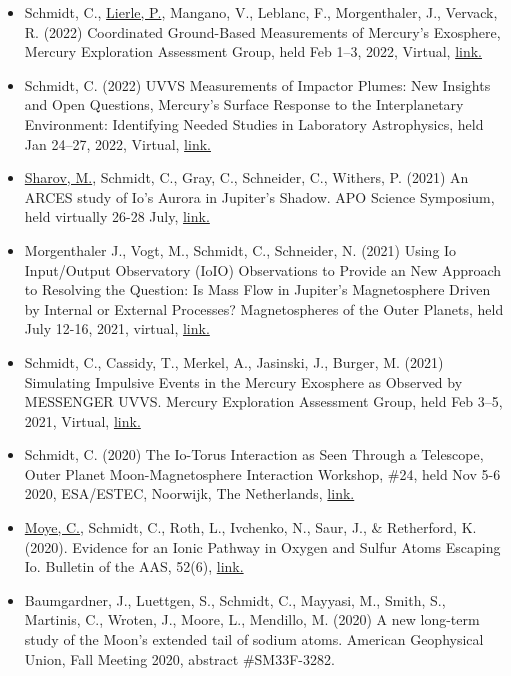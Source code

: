 \documentclass[12pt]{report}
\begin{document}
\begin{itemize}
   \item Schmidt, C., \underline{Lierle, P.}, Mangano, V., Leblanc, F., Morgenthaler, J., Vervack, R. (2022) Coordinated Ground-Based Measurements of Mercury’s Exosphere, Mercury Exploration Assessment Group, held Feb 1–3, 2022, Virtual, \href{https://www.hou.usra.edu/meetings/mexagfebruary2022/eposter/9007.pdf}{link.} 
   \item Schmidt, C. (2022) UVVS Measurements of Impactor Plumes: New Insights and Open Questions, Mercury’s Surface Response to the Interplanetary Environment: Identifying Needed Studies in Laboratory Astrophysics, held Jan 24–27, 2022, Virtual, \href{https://meeting.psi.edu/mercurylab2022/}{link.} 
   \item \underline{Sharov, M.}, Schmidt, C., Gray, C., Schneider, C., Withers, P. (2021) An ARCES study of Io's Aurora in Jupiter’s Shadow. APO Science Symposium, held virtually 26-28 July, \href{ http://astronomy.nmsu.edu/aposcisymposium21/}{link.} 
   \item Morgenthaler J., Vogt, M., Schmidt, C., Schneider, N. (2021) Using Io Input/Output Observatory (IoIO) Observations to Provide an New Approach to Resolving the Question: Is Mass Flow in Jupiter's Magnetosphere Driven by Internal or External Processes? Magnetospheres of the Outer Planets, held July 12-16, 2021, virtual, \href{https://www.mop.uliege.be/upload/docs/application/pdf/2021-06/mop21_conference_booklet.pdf}{link.} 
   \item Schmidt, C., Cassidy, T., Merkel, A., Jasinski, J., Burger, M. (2021) Simulating Impulsive Events in the Mercury Exosphere as Observed by MESSENGER UVVS. Mercury Exploration Assessment Group, held Feb 3–5, 2021, Virtual, \href{https://www.hou.usra.edu/meetings/mexag2021/pdf/mexag2021_program.htm#sess201}{link.} 
   \item Schmidt, C. (2020) The Io-Torus Interaction as Seen Through a Telescope, Outer Planet Moon-Magnetosphere Interaction Workshop, \#24, held Nov 5-6 2020, ESA/ESTEC, Noorwijk, The Netherlands, \href{https://indico.esa.int/event/337/contributions/5611/contribution.pdf}{link.} 
   \item \underline{Moye, C.}, Schmidt, C., Roth, L., Ivchenko, N., Saur, J., \& Retherford, K. (2020). Evidence for an Ionic Pathway in Oxygen and Sulfur Atoms Escaping Io. Bulletin of the AAS, 52(6), \href{https://baas.aas.org/pub/2020n6i318p02}{link.}
   \item Baumgardner, J., Luettgen, S., Schmidt, C., Mayyasi, M., Smith, S., Martinis, C., Wroten, J., Moore, L., Mendillo, M. (2020) A new long-term study of the Moon’s extended tail of sodium atoms. American Geophysical Union, Fall Meeting 2020, abstract \#SM33F-3282.

\end{itemize}
\end{document}
